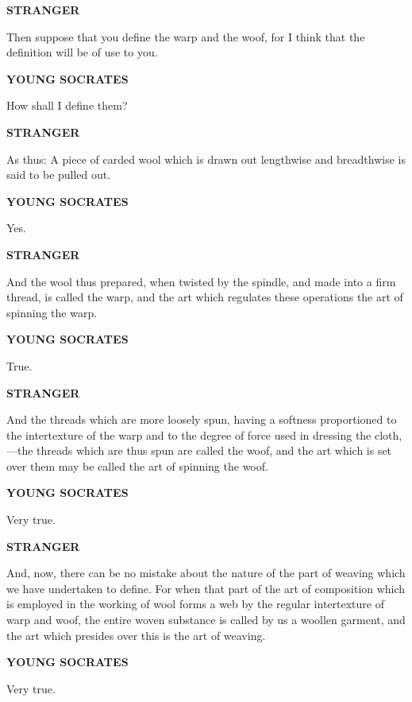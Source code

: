 \documentclass[11pt,letter]{article}
\begin{document}
\par \textbf{STRANGER}
\par   Then suppose that you define the warp and the woof, for I think that the definition will be of use to you.

\par \textbf{YOUNG SOCRATES}
\par   How shall I define them?

\par \textbf{STRANGER}
\par   As thus:  A piece of carded wool which is drawn out lengthwise and breadthwise is said to be pulled out.

\par \textbf{YOUNG SOCRATES}
\par   Yes.

\par \textbf{STRANGER}
\par   And the wool thus prepared, when twisted by the spindle, and made into a firm thread, is called the warp, and the art which regulates these operations the art of spinning the warp.

\par \textbf{YOUNG SOCRATES}
\par   True.

\par \textbf{STRANGER}
\par   And the threads which are more loosely spun, having a softness proportioned to the intertexture of the warp and to the degree of force used in dressing the cloth,—the threads which are thus spun are called the woof, and the art which is set over them may be called the art of spinning the woof.

\par \textbf{YOUNG SOCRATES}
\par   Very true.

\par \textbf{STRANGER}
\par   And, now, there can be no mistake about the nature of the part of weaving which we have undertaken to define. For when that part of the art of composition which is employed in the working of wool forms a web by the regular intertexture of warp and woof, the entire woven substance is called by us a woollen garment, and the art which presides over this is the art of weaving.

\par \textbf{YOUNG SOCRATES}
\par   Very true.
\end{document}
